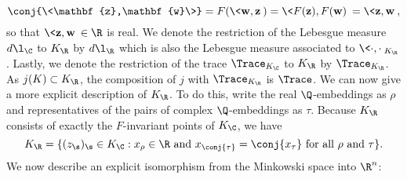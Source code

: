     \[
      \conj{\<\mathbf{z},\mathbf{w}\>} = F(\<\mathbf{w},\mathbf{z}\>) = \<F(\mathbf{z}),F(\mathbf{w})\> = \<\mathbf{z},\mathbf{w}\>,
    \]
    so that $\<\mathbf{z},\mathbf{w}\> \in \R$ is real. We denote the restriction of the Lebesgue measure $d\l_{\C}$ to $K_{\R}$ by $d\l_{\R}$ which is also the Lebesgue measure associated to $\<\cdot,\cdot\>_{K_{\R}}$. Lastly, we denote the restriction of the trace $\Trace_{K_{\C}}$ to $K_{\R}$ by $\Trace_{K_{\R}}$. As $j(K) \subset K_{\R}$, the composition of $j$ with $\Trace_{K_{\R}}$ is $\Trace$. We can now give a more explicit description of $K_{\R}$. To do this, write the real $\Q$-embeddings as $\rho$ and representatives of the pairs of complex $\Q$-embeddings as $\tau$. Because $K_{\R}$ consists of exactly the $F$-invariant points of $K_{\C}$, we have
    \[
      K_{\R} = \{(z_{\s})_{\s} \in K_{\C}:\text{$x_{\rho} \in \R$ and $x_{\conj{\tau}} = \conj{x_{\tau}}$ for all $\rho$ and $\tau$}\}.
    \]
    We now describe an explicit isomorphism from the Minkowski space into $\R^{n}$:
    

